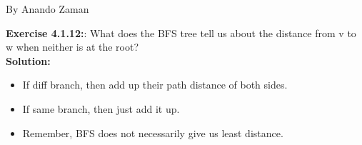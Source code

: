 \documentclass[11pt,fleqn]{article}
\begin{document}
By Anando Zaman

\textbf{Exercise 4.1.12:}: What does the BFS tree tell us about the
distance from v to w when neither is at the root?\\

\textbf{Solution:}
\begin{itemize}
	\item If diff branch, then add up their path distance of both sides.
	\item If same branch, then just add it up.
	\item Remember, BFS does not necessarily give us least distance.
\end{itemize}


	
\end{document}

